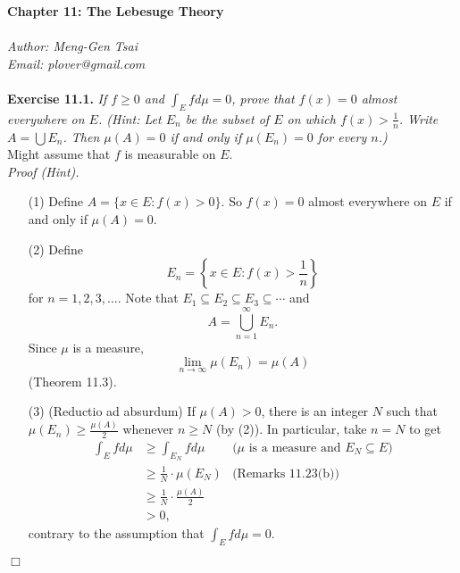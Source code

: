 \documentclass{article}
\begin{document}
\textbf{\Large Chapter 11: The Lebesuge Theory} \\\\



\emph{Author: Meng-Gen Tsai} \\
\emph{Email: plover@gmail.com} \\\\









\textbf{Exercise 11.1.}
\emph{If $f \geq 0$ and $\int_{E} f d\mu = 0$,
prove that $f(x) = 0$ almost everywhere on $E$.
(Hint: Let $E_n$ be the subset of $E$ on which $f(x) > \frac{1}{n}$.
Write $A = \bigcup E_n$.
Then $\mu(A) = 0$ if and only if $\mu(E_n) = 0$ for every $n$.)} \\

Might assume that $f$ is measurable on $E$. \\

\emph{Proof (Hint).}
\begin{enumerate}
\item[(1)]
Define $A = \{ x \in E : f(x) > 0 \}$.
So $f(x) = 0$ almost everywhere on $E$ if and only if $\mu(A) = 0$.

\item[(2)]
Define
\[
  E_n = \left\{ x \in E : f(x) > \frac{1}{n} \right\}
\]
for $n = 1,2,3,\ldots$.
Note that $E_1 \subseteq E_2 \subseteq E_3 \subseteq \cdots$ and
\[
  A = \bigcup_{n=1}^{\infty} E_n.
\]
Since $\mu$ is a measure,
\[
  \lim_{n \to \infty} \mu(E_n) = \mu(A)
\]
(Theorem 11.3).

\item[(3)]
(Reductio ad absurdum)
If $\mu(A)> 0$, there is an integer $N$ such that
$\mu(E_n) \geq \frac{\mu(A)}{2}$ whenever $n \geq N$ (by (2)).
In particular, take $n = N$ to get
\begin{align*}
  \int_E f d\mu
  &\geq \int_{E_N} f d\mu
    &\text{($\mu$ is a measure and $E_N \subseteq E$)}\\
  &\geq \frac{1}{N} \cdot \mu(E_N)
    &\text{(Remarks 11.23(b))} \\
  &\geq \frac{1}{N} \cdot \frac{\mu(A)}{2} \\
  & > 0,
\end{align*}
contrary to the assumption that $\int_{E} f d\mu = 0$.
\end{enumerate}
$\Box$ \\
\end{document}
